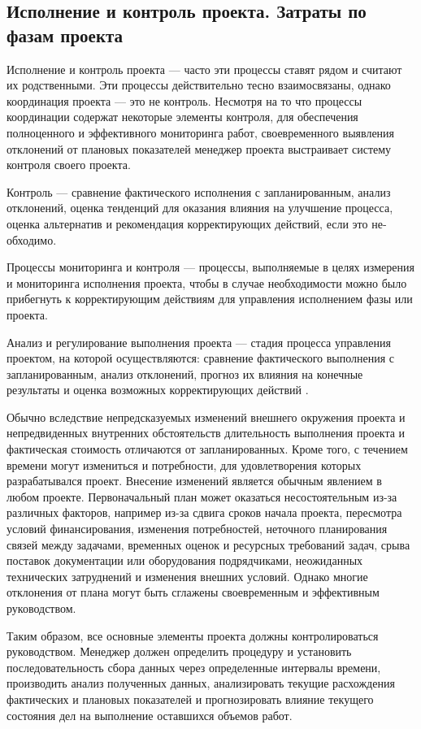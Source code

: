 \subsection{Исполнение и контроль проекта. Затраты по фазам проекта}

Исполнение и контроль проекта --- часто эти процессы ставят рядом и считают их родственными.
Эти процессы действительно тесно взаи­мосвязаны, однако координация проекта --- это не контроль.
Несмотря на то что процессы координации содержат некоторые элементы конт­роля, для обеспечения полноценного и эффективного мониторинга работ, своевременного выявления отклонений от плановых показателей менеджер проекта выстраивает систему контроля своего проекта.

Контроль --- сравнение фактического исполнения с запланированным, анализ отклонений, оценка тенденций для оказания влияния на улучшение процесса, оценка альтернатив и рекомендация корректирующих действий, если это не­обходимо.

Процессы мониторинга и контроля --- процессы, выполняемые в целях из­мерения и мониторинга исполнения проекта, чтобы в случае необходимости можно было прибегнуть к корректирующим действиям для управления исполнением фазы или проекта.

Анализ и регулирование выполнения проекта --- стадия процесса управ­ления проектом, на которой осуществляются: сравнение фактического выпол­нения с запланированным, анализ отклонений, прогноз их влияния на конеч­ные результаты и оценка возможных корректирующих действий \cite[190--191]{polkovnikov}.

Обычно вследствие непредсказуемых изменений внешнего окружения проекта и непредвиденных внутренних обстоятельств длительность выполнения проекта и фактическая стоимость отличаются от запланированных.
Кроме того, с течением времени могут измениться и потребности, для удовлетворения которых разрабатывался проект.
Внесение изменений является обычным явлением в любом проекте.
Первоначальный план может оказаться несостоятельным из-за различных факторов, например из-за сдвига сроков начала проекта, пересмотра условий финансирования, изменения потребностей, неточного планирования связей между задачами, временных оценок и ресурсных требований задач, срыва поставок документации или оборудования подрядчиками, неожиданных технических затруднений и изменения внешних условий.
Однако многие отклонения от плана могут быть сглажены своевременным и эффективным руководством.

Таким образом, все основные элементы проекта должны контролироваться руководством.
Менеджер должен определить процедуру и установить последовательность сбора данных через определенные интервалы времени, производить анализ полученных данных, анализировать текущие расхождения фактических и плановых показателей и прогнозировать влияние текущего состояния дел на выполнение оставшихся объемов работ.

